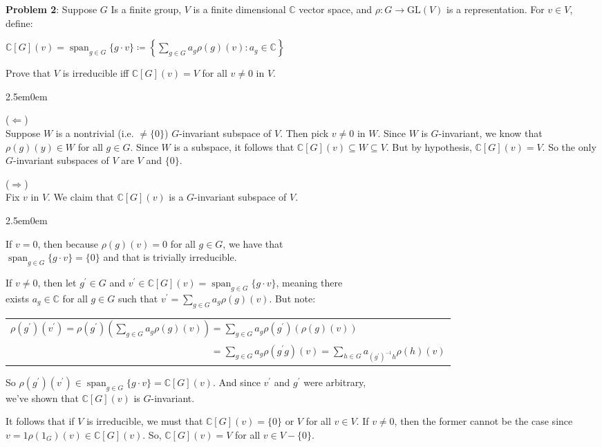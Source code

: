 \documentclass{book}
\newcommand{\exOne}{%
   \color{Purple}%
   \fontsize{13}{15}\selectfont%
}
\newcommand{\exTwoP}{%
   \color{RedViolet}%
   \fontsize{13}{15}\selectfont%
}
\newenvironment{myIndent}{%
   \begin{adjustwidth}{2.5em}{0em}%
}{%
   \end{adjustwidth}%
}
\newcommand{\blab}[1]{\textbf{#1}}
\DeclareMathOperator{\Span}{span}
\newcommand{\retTwo}{\hfill\bigbreak}
\begin{document}
\blab{Problem 2}: Suppose $G$ Is a finite group, $V$ is a finite dimensional $\mathbb{C}$ vector space, and $\rho: G \longrightarrow \mathrm{GL}(V)$ is a representation. For $v \in V$, define:

{\centering $\mathbb{C}[G](v) = \Span_{g \in G}\{g \cdot v\} \coloneq \left\{\sum\limits_{g \in G}a_g \rho(g)(v) \colon a_g \in \mathbb{C}\right\}$ \retTwo\par}

Prove that $V$ is irreducible iff $\mathbb{C}[G](v) = V$ for all $v \neq 0$ in $V$.\newpage


\begin{myIndent}\exOne
	($\Longleftarrow$)\\
	Suppose $W$ is a nontrivial (i.e. $\neq \{0\}$) $G$-invariant subspace of $V$. Then pick $v \neq 0$ in $W$. Since $W$ is $G$-invariant, we know that $\rho(g)(y) \in W$ for all $g \in G$. Since $W$ is a subspace, it follows that $\mathbb{C}[G](v) \subseteq W \subseteq V$. But by hypothesis, $\mathbb{C}[G](v) = V$. So the only $G$-invariant subspaces of $V$ are $V$ and $\{0\}$.\retTwo

	($\Longrightarrow$)\\
	Fix $v$ in $V$. We claim that $\mathbb{C}[G](v)$ is a $G$-invariant subspace of $V$.
	\begin{myIndent}\exTwoP
		If $v = 0$, then because $\rho(g)(v) = 0$ for all $g \in G$, we have that\\ $\Span_{g \in G}\{g \cdot v\} = \{0\}$ and that is trivially irreducible.\retTwo

		If $v \neq 0$, then let $g^\prime \in G$ and $v^\prime \in \mathbb{C}[G](v) = \Span_{g \in G}\{g \cdot v\}$, meaning there\\ [2pt] exists $a_g \in \mathbb{C}$ for all $g \in G$ such that $v^\prime = \sum\limits_{g \in G} a_g \rho(g)(v)$. But note:

		{\centering
		\begin{tabular}{l}
			$\rho(g^\prime)(v^\prime) = \rho(g^\prime)(\sum\limits_{g \in G} a_g \rho(g)(v)) = \sum\limits_{g \in G} a_g \rho(g^\prime)(\rho(g)(v))$\\ [14pt]

			$\phantom{\rho(g^\prime)(v^\prime) = \rho(g^\prime)(\sum\limits_{g \in G} a_g \rho(g)(v))} = \sum\limits_{g \in G} a_g \rho(g^\prime g)(v) = \sum\limits_{h \in G} a_{(g^\prime)^{-1}h}\rho(h)(v)$
		\end{tabular} \retTwo\par}

		So $\rho(g^\prime)(v^\prime) \in \Span_{g \in G}\{g \cdot v\} = \mathbb{C}[G](v)$. And since $v^\prime$ and $g^\prime$ were arbitrary,\\ [2pt] we've shown that $\mathbb{C}[G](v)$ is $G$-invariant.\retTwo
	\end{myIndent}

	It follows that if $V$ is irreducible, we must that $\mathbb{C}[G](v) = \{0\}$ or $V$ for all $v \in V$. If $v \neq 0$, then the former cannot be the case since $v = 1\rho(1_G)(v) \in \mathbb{C}[G](v)$. So, $\mathbb{C}[G](v) = V$ for all $v \in V - \{0\}$.\retTwo
\end{myIndent}
\end{document}
